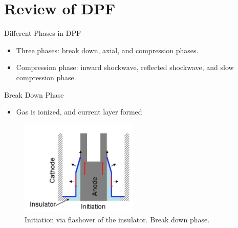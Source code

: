 \section{Review of DPF}
\begin{frame} {Different Phases in DPF}
    \begin{itemize}
        \item Three phases: break down, axial, and compression phases.
        \item Compression phase: inward shockwave, reflected shockwave, and slow compression phase.
    \end{itemize}
\end{frame}

\begin{frame} {Break Down Phase}
    \begin{itemize}
        \item Gas is ionized, and current layer formed
    \end{itemize}
    \begin{figure}
        \centering
        \includegraphics[width=0.5\textwidth]{figures/breakdown-phase.png}
        \caption{Initiation via flashover of the insulator. Break down phase. \cite{krishnan_2012_dense}}
        \label{fig:breakdown-phase}
    \end{figure}
\end{frame}

